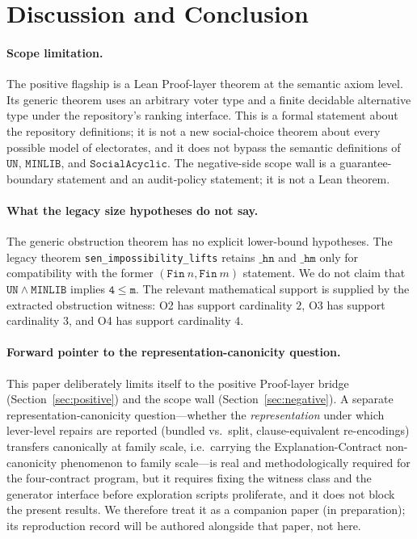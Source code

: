 \section{Discussion and Conclusion}
\label{sec:conclusion}

\paragraph{Scope limitation.}
The positive flagship is a Lean Proof-layer theorem at the semantic axiom level.
Its generic theorem uses an arbitrary voter type and a finite decidable alternative type under the repository's ranking interface.
This is a formal statement about the repository definitions; it is not a new social-choice theorem about every possible model of electorates, and it does not bypass the semantic definitions of \(\mathtt{UN}\), \(\mathtt{MINLIB}\), and \(\mathtt{SocialAcyclic}\).
The negative-side scope wall is a guarantee-boundary statement and an audit-policy statement; it is not a Lean theorem.

\paragraph{What the legacy size hypotheses do not say.}
\begin{sloppypar}
The generic obstruction theorem has no explicit lower-bound hypotheses.
The legacy theorem \texttt{sen\_impossibility\_lifts} retains \(\mathtt{\_hn}\) and \(\mathtt{\_hm}\) only for compatibility with the former \((\mathtt{Fin}\ n,\mathtt{Fin}\ m)\) statement.
We do not claim that \(\mathtt{UN \wedge MINLIB}\) implies \(\mathtt{4 \leq m}\).
The relevant mathematical support is supplied by the extracted obstruction witness: O2 has support cardinality \(2\), O3 has support cardinality \(3\), and O4 has support cardinality \(4\).
\end{sloppypar}

\paragraph{Forward pointer to the representation-canonicity question.}
This paper deliberately limits itself to the positive Proof-layer bridge (Section~\ref{sec:positive}) and the scope wall (Section~\ref{sec:negative}).
A separate representation-canonicity question---whether the \emph{representation} under which lever-level repairs are reported (bundled vs.\ split, clause-equivalent re-encodings) transfers canonically at family scale, i.e.\ carrying the Explanation-Contract non-canonicity phenomenon to family scale---is real and methodologically required for the four-contract program, but it requires fixing the witness class and the generator interface before exploration scripts proliferate, and it does not block the present results.
We therefore treat it as a companion paper (in preparation); its reproduction record will be authored alongside that paper, not here.

